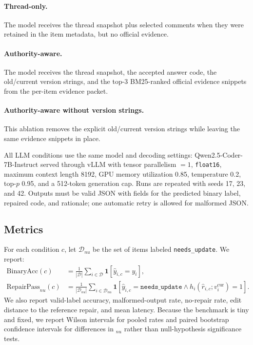 \documentclass{article}
\newcommand{\needsupdate}{\texttt{needs\_update}}
\begin{document}
\paragraph{Thread-only.}
The model receives the thread snapshot plus selected comments when they were retained in the item metadata, but no official evidence.

\paragraph{Authority-aware.}
The model receives the thread snapshot, the accepted answer code, the old/current version strings, and the top-3 BM25-ranked official evidence snippets from the per-item evidence packet.

\paragraph{Authority-aware without version strings.}
This ablation removes the explicit old/current version strings while leaving the same evidence snippets in place.

All LLM conditions use the same model and decoding settings: Qwen2.5-Coder-7B-Instruct served through vLLM with tensor parallelism $=1$, \texttt{float16}, maximum context length 8192, GPU memory utilization 0.85, temperature 0.2, top-$p$ 0.95, and a 512-token generation cap. Runs are repeated with seeds 17, 23, and 42. Outputs must be valid JSON with fields for the predicted binary label, repaired code, and rationale; one automatic retry is allowed for malformed JSON.

\subsection{Metrics}

For each condition $c$, let $\mathcal{D}_{nu}$ be the set of items labeled \needsupdate. We report:
\begin{align*}
\text{BinaryAcc}(c) &= \frac{1}{|\mathcal{D}|}\sum_{i \in \mathcal{D}} \mathbf{1}[\hat{y}_{i,c}=y_i], \\
\text{RepairPass}_{nu}(c) &= \frac{1}{|\mathcal{D}_{nu}|}\sum_{i \in \mathcal{D}_{nu}} \mathbf{1}[\hat{y}_{i,c}=\texttt{needs\_update} \land h_i(\hat{r}_{i,c}; v_i^{\text{cur}})=1].
\end{align*}
We also report valid-label accuracy, malformed-output rate, no-repair rate, edit distance to the reference repair, and mean latency. Because the benchmark is tiny and fixed, we report Wilson intervals for pooled rates and paired bootstrap confidence intervals for differences in $_{nu}$ rather than null-hypothesis significance tests.
\end{document}
